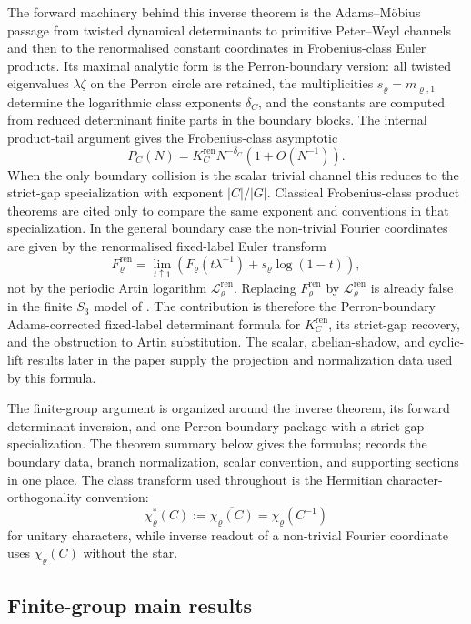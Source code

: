 The forward machinery behind this inverse theorem is the Adams--M\"obius
passage from twisted dynamical determinants to primitive Peter--Weyl channels
and then to the renormalised constant coordinates in Frobenius-class Euler
products.  Its maximal analytic form is the Perron-boundary version: all
twisted eigenvalues \(\lambda\zeta\) on the Perron circle are retained, the multiplicities
\(s_\varrho=m_{\varrho,1}\) determine the logarithmic class exponents
\(\delta_C\), and the constants are computed from reduced determinant finite
parts in the boundary blocks.  The internal product-tail argument gives the
Frobenius-class asymptotic
\[
  P_C(N)=K_C^{\mathrm{ren}} N^{-\delta_C}(1+O(N^{-1})).
\]
When the only boundary collision is the scalar trivial channel this reduces
to the strict-gap specialization with exponent \(|C|/|G|\).  Classical
Frobenius-class product theorems are cited only to compare the same exponent
and conventions in that specialization.  In the general boundary case the
non-trivial Fourier coordinates are given by the renormalised fixed-label
Euler transform
\[
  F_\varrho^{\mathrm{ren}}
  =\lim_{t\uparrow1}
    \left(F_\varrho(t\lambda^{-1})+s_\varrho\log(1-t)\right),
\]
not by the periodic Artin logarithm \(\mathcal L_\varrho^{\mathrm{ren}}\).
Replacing \(F_\varrho^{\mathrm{ren}}\) by
\(\mathcal L_\varrho^{\mathrm{ren}}\) is already false in the finite
\(S_3\) model of .  The contribution is
therefore the Perron-boundary Adams-corrected fixed-label determinant formula
for \(K_C^{\mathrm{ren}}\), its strict-gap recovery, and the obstruction to
Artin substitution.  The scalar, abelian-shadow, and cyclic-lift results later
in the paper supply the projection and normalization data used by this formula.

The finite-group argument is organized around the inverse theorem, its
forward determinant inversion, and one Perron-boundary package with a
strict-gap specialization.  The theorem summary below gives the formulas;
 records the boundary data, branch
normalization, scalar convention, and supporting sections in one place.  The
class transform used throughout is the Hermitian character-orthogonality
convention:
\[
  \chi_\varrho^\ast(C)
  :=\overline{\chi_\varrho(C)}
  =\chi_\varrho(C^{-1})
\]
for unitary characters, while inverse readout of a non-trivial Fourier
coordinate uses \(\chi_\varrho(C)\) without the star.

\subsection{Finite-group main results}

